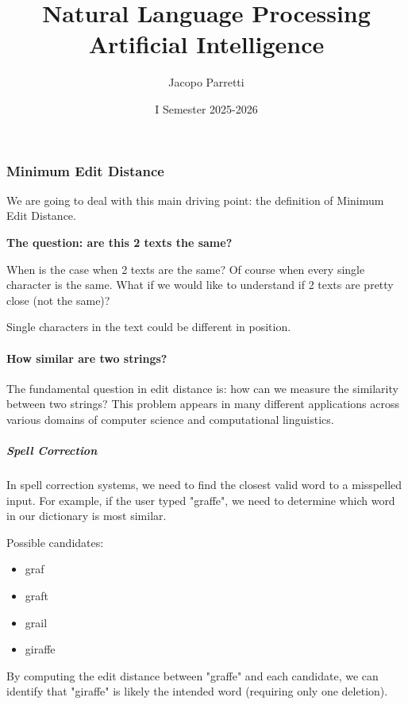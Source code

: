 \documentclass[11pt,a4paper]{article}
\title{\textbf{Natural Language Processing}\\
\large Artificial Intelligence}
\author{Jacopo Parretti}
\date{I Semester 2025-2026}
\theoremstyle{definition}
\theoremstyle{plain}
\theoremstyle{remark}
\begin{document}
\maketitle
\newpage
\tableofcontents
\newpage

\part{}

\section{Minimum Edit Distance}
We are going to deal with this main driving point: the definition of Minimum Edit Distance.

\textbf{The question: are this 2 texts the same?}

When is the case when 2 texts are the same? Of course when every single character is the same. 
What if we would like to understand if 2 texts are pretty close (not the same)?

Single characters in the text could be different in position.

\subsection{How similar are two strings?}

The fundamental question in edit distance is: how can we measure the similarity between two strings? This problem appears in many different applications across various domains of computer science and computational linguistics.

\subsubsection{Spell Correction}
In spell correction systems, we need to find the closest valid word to a misspelled input. For example, if the user typed "graffe", we need to determine which word in our dictionary is most similar.

Possible candidates:
\begin{itemize}
    \item graf
    \item graft
    \item grail
    \item giraffe
\end{itemize}

By computing the edit distance between "graffe" and each candidate, we can identify that "giraffe" is likely the intended word (requiring only one deletion).
\end{document}
